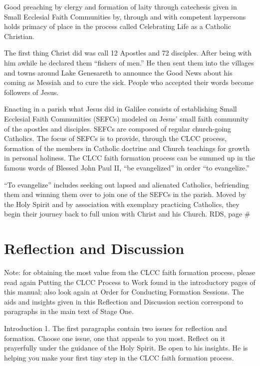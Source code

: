 \documentclass[oneside]{book}
\begin{document}
Good preaching by clergy and formation of laity through catechesis given in
Small Ecclesial Faith Communities by, through and with competent laypersons
holds primacy of place in the process called Celebrating Life as a Catholic
Christian.

The first thing Christ did was call 12 Apostles and 72 disciples. After being
with him awhile he declared them ``fishers of men.'' He then sent them into the
villages and towns around Lake Genesareth  to announce the Good News about his
coming as Messiah and to cure the sick. People who accepted their words become
followers of Jesus.

Enacting in a parish what Jesus did in Galilee consists of establishing Small
Ecclesial Faith Communities (SEFCs) modeled on Jesus' small faith community of
the apostles and disciples. SEFCs are composed of regular church-going
Catholics. The focus of SEFCs is to provide, through the CLCC process, formation
of the members in Catholic doctrine and Church teachings for growth in personal
holiness. The CLCC faith formation process can be summed up in the famous words
of Blessed John Paul II, ``be evangelized'' in order ``to evangelize.''

``To evangelize'' includes seeking out lapsed and alienated Catholics,
befriending them and winning them over to join one of the SEFCs in the
parish. Moved by the Holy Spirit and by association with exemplary practicing
Catholics, they begin their journey back to full union with Christ and his
Church.
RDS, page \#


\section{Reflection and Discussion}

Note:  for obtaining the most value from the CLCC faith formation process,
please read again Putting the CLCC Process to Work found in the introductory
pages of this manual; also look again at Order for Conducting Formation
Sessions.  The aids and insights given in this Reflection and Discussion section
correspond to paragraphs in the main text of Stage One.


Introduction
1. The first paragraphs contain two issues for reflection and formation. Choose
one issue, one that appeals to you most. Reflect on it prayerfully under the
guidance of the Holy Spirit. Be open to his insights. He is helping you make
your first tiny step in the CLCC faith formation process.
\end{document}
